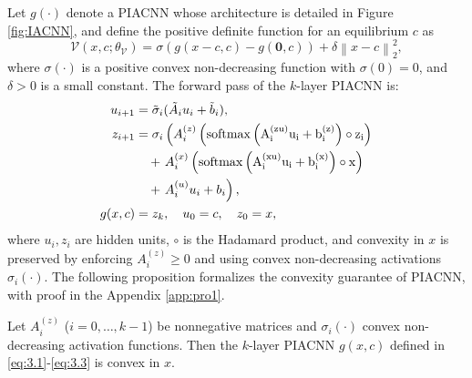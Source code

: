 \documentclass[journal]{IEEEtran}
\begin{document}
Let $g(\cdot)$ denote a PIACNN whose architecture is detailed in Figure \ref{fig:IACNN}, and define the positive definite function for an equilibrium $c$ as
\begin{equation*} 
	\mathcal{V}(x,c;\theta_{\mathcal{V}}) = \sigma (g(x - c,c) - g(\mathbf{0},c)) + \delta \left\| {x - c} \right\|_2^2,
\end{equation*}
where $\sigma(\cdot)$ is a positive convex non-decreasing function with $\sigma (0) = 0$, and $\delta > 0$ is a small constant. The forward pass of the $k$-layer PIACNN is:
\begin{align}
	u_{i+1} &= \tilde{\sigma}_i(\tilde{A}_i u_i + \tilde{b}_i),  \label{eq:3.1}\\
	z_{i+1} &= \sigma_i \left( A_i^{(z)} \left( \rm{softmax}\left( A_i^{(zu)} u_i + b_i^{(z)} \right) \circ z_i \right) \right. \nonumber \\
	&\quad + \left. A_i^{(x)} \left( \rm{softmax}\left( A_i^{(xu)} u_i + b_i^{(x)} \right) \circ x \right) \right. \nonumber \\
	&\quad + \left. A_i^{(u)} u_i + b_i \right) \label{eq:3.2} , \\
	g(x, c) &= z_k, \quad u_0 = c , \quad z_0=x \label{eq:3.3},
\end{align}
where $u_i, z_i$ are hidden units, $\circ$ is the Hadamard product, and convexity in $x$ is preserved by enforcing $A_i^{(z)} \geq 0$ and using convex non-decreasing activations $\sigma_i(\cdot)$. The following proposition formalizes the convexity guarantee of PIACNN, with proof in the Appendix \ref{app:pro1}.
\begin{proposition} \label{propos:1}
	Let $A_i^{(z)}$ ($i = 0, \dots, k-1$) be nonnegative matrices and $\sigma_i(\cdot)$ convex non-decreasing activation functions. Then the $k$-layer PIACNN $g(x, c)$ defined in \eqref{eq:3.1}-\eqref{eq:3.3} is convex in $x$.
\end{proposition}
\end{document}

